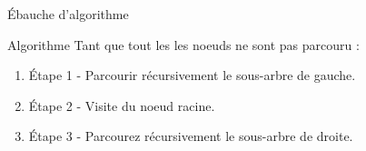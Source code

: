 \documentclass[10pt,xcolor=dvipsnames]{beamer}
\begin{document}

\begin{frame}{Ébauche d'algorithme}
    \begin{alertblock}{Algorithme}
    Tant que tout les les noeuds ne sont pas parcouru :
    \begin{enumerate}
        \item Étape 1 - Parcourir récursivement le sous-arbre de gauche.
        \item Étape 2 - Visite du noeud racine.
        \item Étape 3 - Parcourez récursivement le sous-arbre de droite.
    \end{enumerate}
    \end{alertblock}
\end{frame}
\end{document}
